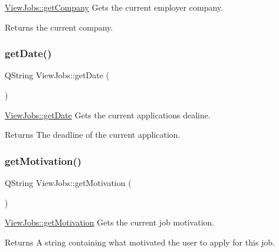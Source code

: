\hyperlink{class_view_jobs_a88d7c0a7a79bc7a7e02b524587983bf8}{View\+Jobs\+::get\+Company} Gets the current employer company. 

\begin{DoxyReturn}{Returns}
the current company. 
\end{DoxyReturn}
\mbox{\label{class_view_jobs_af046f9201cc6031e070b4f9b613a35f9}} 
\subsubsection{\texorpdfstring{get\+Date()}{getDate()}}
{\footnotesize\ttfamily Q\+String View\+Jobs\+::get\+Date (\begin{DoxyParamCaption}{ }\end{DoxyParamCaption})}



\hyperlink{class_view_jobs_af046f9201cc6031e070b4f9b613a35f9}{View\+Jobs\+::get\+Date} Gets the current application\textquotesingle{}s dealine. 

\begin{DoxyReturn}{Returns}
The deadline of the current application. 
\end{DoxyReturn}
\mbox{\label{class_view_jobs_a238ec5365ef2c39baa97670769dfedca}} 
\subsubsection{\texorpdfstring{get\+Motivation()}{getMotivation()}}
{\footnotesize\ttfamily Q\+String View\+Jobs\+::get\+Motivation (\begin{DoxyParamCaption}{ }\end{DoxyParamCaption})}



\hyperlink{class_view_jobs_a238ec5365ef2c39baa97670769dfedca}{View\+Jobs\+::get\+Motivation} Gets the current job motivation. 

\begin{DoxyReturn}{Returns}
A string containing what motivated the user to apply for this job. 
\end{DoxyReturn}
\mbox{\label{class_view_jobs_a91696fde9f0a663bae929390aac8324b}} 
